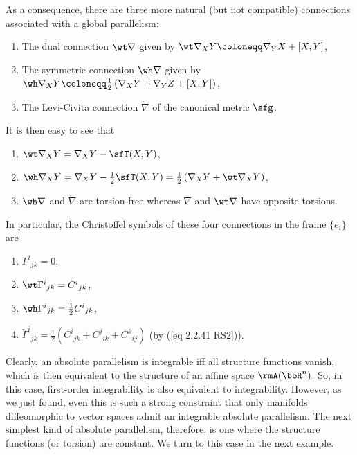 \begin{example}
    As a consequence, there are three more natural (but not compatible) connections associated with a global parallelism:
    \begin{enumerate}
        \item The dual connection $\wt\nabla$ given by $\wt\nabla_X Y\coloneqq \nabla_Y X+[X,Y]$,
        \item The symmetric connection $\wh\nabla$ given by $\wh\nabla_X Y\coloneqq \frac12\left(\nabla_X Y+\nabla_Y Z+[X,Y]\right)$,
        \item The Levi-Civita connection $\mathring{\nabla}$ of the canonical metric $\sfg$.
    \end{enumerate}
    It is then easy to see that 
    \begin{enumerate}
        \item $\wt\nabla_X Y=\nabla_X Y-\sfT(X,Y)$,
        \item $\wh\nabla_X Y=\nabla_X Y-\frac12\sfT(X,Y)=\frac12\left(\nabla_X Y+\wt\nabla_X Y\right)$,
        \item $\wh\nabla$ and $\mathring{\nabla}$ are torsion-free whereas $\nabla$ and $\wt\nabla$ have opposite torsions.
    \end{enumerate}
    In particular, the Christoffel symbols of these four connections in the frame $\{e_i\}$ are 
    \begin{enumerate}
        \item $\Gamma^i{}_{jk}=0$,
        \item $\wt\Gamma^i{}_{jk}=C^i{}_{jk}$,
        \item $\wh\Gamma^i{}_{jk}=\frac12 C^i{}_{jk}$,
        \item $\mathring{\Gamma}^i{}_{jk}=\frac12\left(C^i{}_{jk}+C^j{}_{ik}+C^k{}_{ij}\right)$ (by (\ref{eq 2.2.41 RS2})).
    \end{enumerate}

    Clearly, an absolute parallelism is integrable iff all structure functions vanish, which is then equivalent to the structure of an affine space $\rmA(\bbR^n)$. So, in this case, first-order integrability is also equivalent to integrability. However, as we just found, even this is such a strong constraint that only manifolds diffeomorphic to vector spaces admit an integrable absolute parallelism. The next simplest kind of absolute parallelism, therefore, is one where the structure functions (or torsion) are constant. We turn to this case in the next example.
\end{example}


